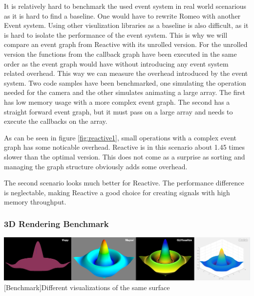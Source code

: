 It is relatively hard to benchmark the used event system in real world scenarious as it is hard to find a baseline.
One would have to rewrite Romeo with another Event system. 
Using other visulization libraries as a baseline is also difficult, as it is hard to isolate the performance of the event system.
This is why we will compare an event graph from Reactive with its unrolled version.
For the unrolled version the functions from the callback graph have been executed in the same order as the event graph would have without introducing any event system related overhead.
This way we can measure the overhead introduced by the event system.
Two code samples have been benchmarked, one simulating the operation needed for the camera and the other simulates animating a large array.
The first has low memory usage with a more complex event graph. The second has a straight forward event graph, but it must pass on a large array and needs to execute the callbacks on the array.

As can be seen in figure \ref{fig:reactive1}, small operations with a complex event graph has some noticable overhead. Reactive is in this scenario about 1.45 times slower than the optimal version.
This does not come as a surprise as sorting and managing the graph structure obviously adds some overhead.

The second scenario looks much better for Reactive. The performance difference is neglectable, making Reactive a good choice for creating signals with high memory throughput.

\subsubsection{3D Rendering Benchmark}

\begin{minipage}{\linewidth}
    \centering
    \includegraphics[width=\linewidth]{graphics/vispy_mayavi_romeo.jpg}
    [Benchmark]{Different visualizations of the same surface}
    \label{fig:reactive1}
\end{minipage}

